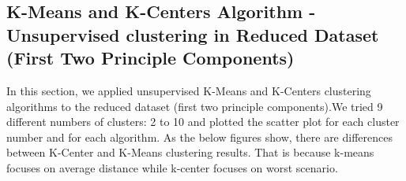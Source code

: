 \documentclass[]{article}
\begin{document}
\subsection{K-Means and K-Centers Algorithm - Unsupervised clustering in
Reduced Dataset (First Two Principle
Components)}\label{k-means-and-k-centers-algorithm---unsupervised-clustering-in-reduced-dataset-first-two-principle-components}

In this section, we applied unsupervised K-Means and K-Centers
clustering algorithms to the reduced dataset (first two principle
components).We tried 9 different numbers of clusters: 2 to 10 and
plotted the scatter plot for each cluster number and for each algorithm.
As the below figures show, there are differences between K-Center and
K-Means clustering results. That is because k-means focuses on average
distance while k-center focuses on worst scenario.
\end{document}
